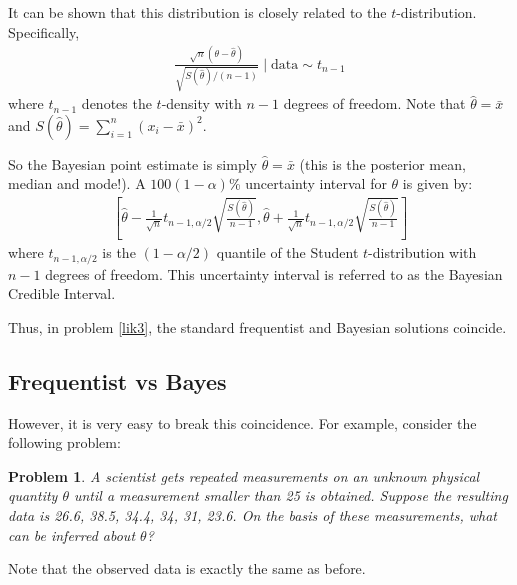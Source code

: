 \documentclass{scrartcl}
\newtheorem{problem}[theorem]{Problem}
\begin{document}
It can be shown that this distribution is closely related to the
$t$-distribution. Specifically, 
\begin{align}\label{bayes_prob_4}
\frac{\sqrt{n}(\theta - \hat{\theta})}{\sqrt{S(\hat{\theta})/(n-1)}}
  \mid \text{data} \sim t_{n-1}
\end{align}
where $t_{n-1}$ denotes the $t$-density with $n-1$ degrees of
freedom. Note that $\hat{\theta} = \bar{x}$ and $S(\hat{\theta}) =
\sum_{i=1}^n (x_i - \bar{x})^2$.

So the Bayesian point estimate is simply $\hat{\theta} = \bar{x}$
(this is the posterior mean, median and mode!). A $100(1 - \alpha)$\%
uncertainty interval for $\theta$ is given by:
\begin{align}\label{cred_int_4}
\left[  \hat{\theta} - \frac{1}{\sqrt{n}} t_{n-1, \alpha/2}
  \sqrt{\frac{S(\hat{\theta})}{n-1}},   \hat{\theta} +
  \frac{1}{\sqrt{n}} t_{n-1, \alpha/2} 
  \sqrt{\frac{S(\hat{\theta})}{n-1}} \right] 
\end{align}
where $t_{n-1, \alpha/2}$ is the $(1 - \alpha/2)$ quantile of the
Student $t$-distribution with $n-1$ degrees of freedom. This
uncertainty interval is referred to as the Bayesian Credible Interval.   

Thus, in problem \ref{lik3}, the standard frequentist and Bayesian
solutions coincide.

\subsection{Frequentist vs Bayes}

However, it is very easy to break this coincidence. For example,
consider the following problem:
\begin{problem}\label{lik3_prime}
  A scientist gets repeated measurements on an unknown physical
  quantity $\theta$ until a measurement smaller than 25 is
  obtained. Suppose the resulting data is 26.6, 38.5, 34.4, 34, 31,
  23.6. On the basis of these measurements, what can be inferred about
  $\theta$?  
\end{problem}
Note that the observed data is exactly the same as before.
\end{document}

